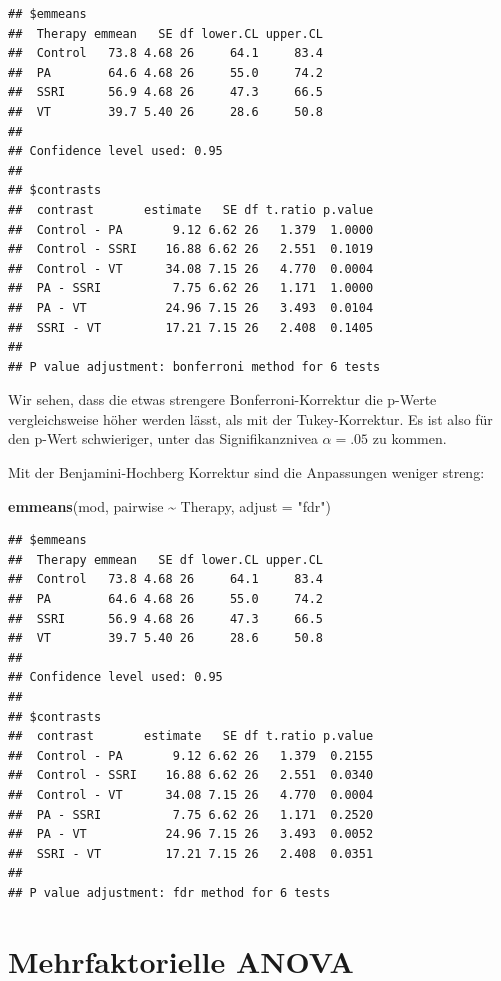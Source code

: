 \documentclass[
]{book}
\newenvironment{Shaded}{\begin{snugshade}}{\end{snugshade}}
\newcommand{\AttributeTok}[1]{\textcolor[rgb]{0.13,0.29,0.53}{#1}}
\newcommand{\FunctionTok}[1]{\textcolor[rgb]{0.13,0.29,0.53}{\textbf{#1}}}
\newcommand{\NormalTok}[1]{#1}
\newcommand{\SpecialCharTok}[1]{\textcolor[rgb]{0.81,0.36,0.00}{\textbf{#1}}}
\newcommand{\StringTok}[1]{\textcolor[rgb]{0.31,0.60,0.02}{#1}}
\begin{document}
\begin{verbatim}
## $emmeans
##  Therapy emmean   SE df lower.CL upper.CL
##  Control   73.8 4.68 26     64.1     83.4
##  PA        64.6 4.68 26     55.0     74.2
##  SSRI      56.9 4.68 26     47.3     66.5
##  VT        39.7 5.40 26     28.6     50.8
## 
## Confidence level used: 0.95 
## 
## $contrasts
##  contrast       estimate   SE df t.ratio p.value
##  Control - PA       9.12 6.62 26   1.379  1.0000
##  Control - SSRI    16.88 6.62 26   2.551  0.1019
##  Control - VT      34.08 7.15 26   4.770  0.0004
##  PA - SSRI          7.75 6.62 26   1.171  1.0000
##  PA - VT           24.96 7.15 26   3.493  0.0104
##  SSRI - VT         17.21 7.15 26   2.408  0.1405
## 
## P value adjustment: bonferroni method for 6 tests
\end{verbatim}

Wir sehen, dass die etwas strengere Bonferroni-Korrektur die p-Werte vergleichsweise höher werden lässt, als mit der Tukey-Korrektur. Es ist also für den p-Wert schwieriger, unter das Signifikanznivea \(\alpha=.05\) zu kommen.

Mit der Benjamini-Hochberg Korrektur sind die Anpassungen weniger streng:

\begin{Shaded}
\begin{Highlighting}[]
\FunctionTok{emmeans}\NormalTok{(mod, pairwise }\SpecialCharTok{\textasciitilde{}}\NormalTok{ Therapy, }\AttributeTok{adjust =} \StringTok{"fdr"}\NormalTok{)}
\end{Highlighting}
\end{Shaded}

\begin{verbatim}
## $emmeans
##  Therapy emmean   SE df lower.CL upper.CL
##  Control   73.8 4.68 26     64.1     83.4
##  PA        64.6 4.68 26     55.0     74.2
##  SSRI      56.9 4.68 26     47.3     66.5
##  VT        39.7 5.40 26     28.6     50.8
## 
## Confidence level used: 0.95 
## 
## $contrasts
##  contrast       estimate   SE df t.ratio p.value
##  Control - PA       9.12 6.62 26   1.379  0.2155
##  Control - SSRI    16.88 6.62 26   2.551  0.0340
##  Control - VT      34.08 7.15 26   4.770  0.0004
##  PA - SSRI          7.75 6.62 26   1.171  0.2520
##  PA - VT           24.96 7.15 26   3.493  0.0052
##  SSRI - VT         17.21 7.15 26   2.408  0.0351
## 
## P value adjustment: fdr method for 6 tests
\end{verbatim}

\section{Mehrfaktorielle ANOVA}\label{mehrfaktorielle-anova}
\end{document}
